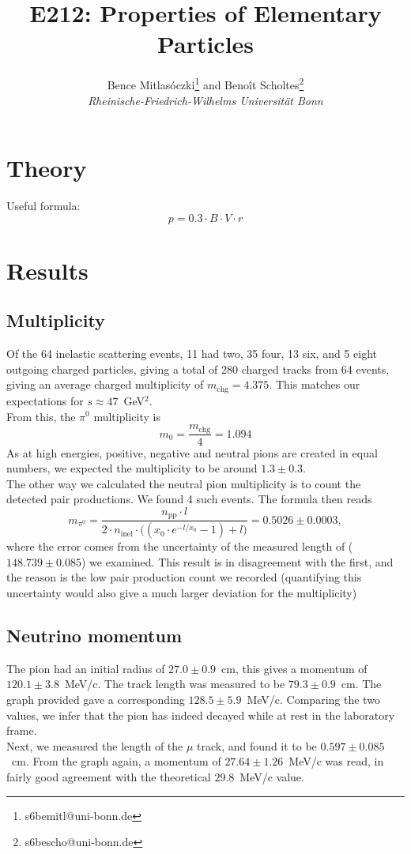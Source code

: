 \documentclass[twocolumn]{article}
\title{\textbf{E212: Properties of Elementary Particles}}
\author{Bence Mitlasóczki\thanks{s6bemitl@uni-bonn.de} and Beno\^it Scholtes\thanks{s6bescho@uni-bonn.de} \\ \textit{Rheinische-Friedrich-Wilhelms Universit\"at Bonn}}
\begin{document}
\section{Theory}
Useful formula:
\begin{equation}\label{eqn:radius}
p = 0.3 \cdot B \cdot V \cdot r
\end{equation}
\section{Results}
\subsection{Multiplicity}
Of the 64 inelastic scattering events, 11 had two, 35 four, 13 six, and 5 eight outgoing charged particles, giving a total of 280 charged tracks from 64 events, giving an average charged multiplicity of $ m_{\text{chg}} = 4.375$.
This matches our expectations for $s \approx 47$~GeV$^2$.\cite{fernow}\\
From this, the $\pi^0$ multiplicity is 
\begin{equation}
m_0 = \frac{m_{\text{chg}}}{4} = 1.094 \nonumber
\end{equation}
As at high energies, positive, negative and neutral pions are created in equal numbers,\cite{perkins, fernow} we expected the multiplicity to be around $1.3 \pm 0.3$.\\
The other way we calculated the neutral pion multiplicity is to count the detected pair productions. We found 4 such events. The formula then reads
\begin{equation}
m_{\pi^0} = \frac{n_{\text{pp}}\cdot l}{2\cdot n_{\text{inel}} \cdot \big((x_0 \cdot e^{- l/x_0}-1)+l\big)} = 0.5026 \pm 0.0003,
\end{equation}
where the error comes from the uncertainty of the measured length of ($148.739 \pm 0.085$) we examined. This result is in disagreement with the first, and the reason is the low pair production count we recorded (quantifying this uncertainty would also give a much larger deviation for the multiplicity)
\subsection{Neutrino momentum}
The pion had an initial radius of $27.0 \pm 0.9$~cm, this gives a momentum of $120.1 \pm 3.8$~MeV/c. The track length was measured to be $79.3 \pm 0.9$~cm. The graph provided gave a corresponding $128.5 \pm 5.9$~MeV/c. Comparing the two values, we infer that the pion has indeed decayed while at rest in the laboratory frame.\\
Next, we measured the length of the $\mu$ track, and found it to be $0.597 \pm 0.085$~cm. From the graph again, a momentum of $27.64 \pm 1.26$~MeV/c was read, in fairly good agreement with the theoretical $29.8$~MeV/c value.\cite{fernow} 
\end{document}
